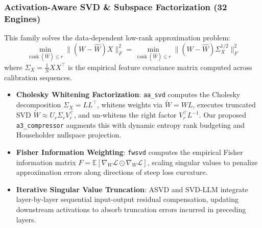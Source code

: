 \documentclass{article}
\begin{document}
\subsubsection{Activation-Aware SVD \& Subspace Factorization (32 Engines)}
This family solves the data-dependent low-rank approximation problem:
\begin{equation}
    \min_{\operatorname{rank}(\hat{W}) \le r} \|(W - \hat{W}) X\|_F^2 = \min_{\operatorname{rank}(\hat{W}) \le r} \|(W - \hat{W}) \Sigma_X^{1/2}\|_F^2
\end{equation}
where $\Sigma_X = \frac{1}{N} X X^\top$ is the empirical feature covariance matrix computed across calibration sequences.
\begin{itemize}
    \item \textbf{Cholesky Whitening Factorization}: \texttt{aa\_svd} \citep{aa_svd_2026} computes the Cholesky decomposition $\Sigma_X = L L^\top$, whitens weights via $\tilde{W} = W L$, executes truncated SVD $\tilde{W} \approx U_r \Sigma_r V_r^\top$, and un-whitens the right factor $V_r^\top L^{-1}$. Our proposed \texttt{a3\_compressor} \citep{a3_ours} augments this with dynamic entropy rank budgeting and Householder nullspace projection.
    \item \textbf{Fisher Information Weighting}: \texttt{fwsvd} \citep{fwsvd_2026} computes the empirical Fisher information matrix $F = \mathbb{E}[\nabla_W \mathcal{L} \odot \nabla_W \mathcal{L}]$, scaling singular values to penalize approximation errors along directions of steep loss curvature.
    \item \textbf{Iterative Singular Value Truncation}: ASVD \citep{yuan2023asvd} and SVD-LLM \citep{wang2024svdllm} integrate layer-by-layer sequential input-output residual compensation, updating downstream activations to absorb truncation errors incurred in preceding layers.
\end{itemize}
\end{document}

